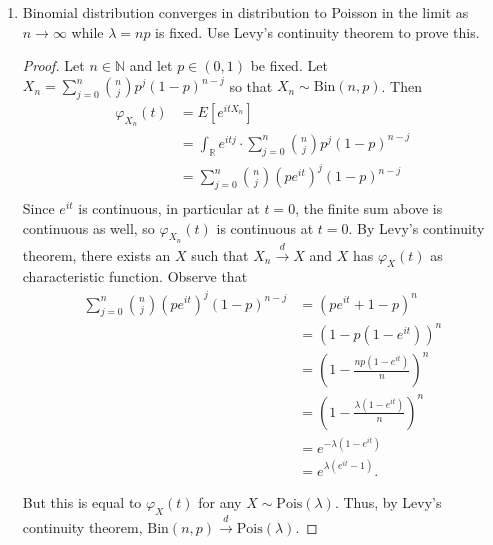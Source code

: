 \documentclass[11pt,oneside,english]{amsart}
\theoremstyle{definition}
\newcommand{\lspace}{\vspace{5mm}}
\newcommand{\MB}[1]{\mathbb{#1}}
\newcommand{\1}{\mathbbm{1}}
\begin{document}
\rightline{\today}

\lspace




\begin{enumerate}[leftmargin=*]
\itemsep5mm



\item Binomial distribution converges in distribution to Poisson in the limit as $n\to\infty$ while $\lambda=np$ is fixed. Use Levy's continuity theorem to prove this.%

\begin{proof}
Let $n\in \MB{N}$ and let $p\in(0,1)$ be fixed. Let $X_n=\sum_{j=0}^n{n\choose j}p^j(1-p)^{n-j}$ so that $X_n\sim \text{Bin}(n,p)$. Then
\begin{align*}
\varphi_{X_n}(t)&=E\left[e^{itX_n}\right]\\[2mm]
&=\int_\MB{R} e^{itj}\cdot\sum_{j=0}^n{n\choose j}p^j(1-p)^{n-j}\\[2mm]
&=\sum_{j=0}^n{n\choose j}(pe^{it})^j(1-p)^{n-j}\\[2mm]
%
\end{align*}
Since $e^{it}$ is continuous, in particular at $t=0$, the finite sum above is continuous as well, so $\varphi_{X_n}(t)$ is continuous at $t=0$. By Levy's continuity theorem, there exists an $X$ such that $X_n\xrightarrow{d} X$ and $X$ has $\varphi_X(t)$ as characteristic function. Observe that
\begin{align*}
\sum_{j=0}^n{n\choose j}(pe^{it})^j(1-p)^{n-j}&=(pe^{it}+1-p)^n\\[2mm]
&=(1-p(1-e^{it}))^n\\[2mm]
&=\left(1-\frac{np(1-e^{it})}{n}\right)^n\\[2mm]
&=\left(1-\frac{\lambda(1-e^{it})}{n}\right)^n\\[2mm]
&=e^{-\lambda(1-e^{it})}\\[2mm]
&=e^{\lambda(e^{it}-1)}.
\end{align*}

But this is equal to $\varphi_X(t)$ for any $X\sim\text{Pois}(\lambda)$. Thus, by Levy's continuity theorem, $\text{Bin}(n,p)\xrightarrow{d} \text{Pois}(\lambda)$.
\end{proof}





\end{enumerate}
\end{document}
